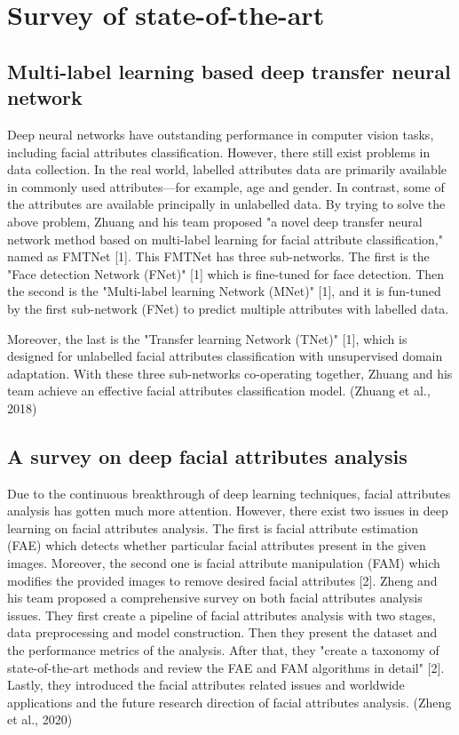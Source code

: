 \documentclass{article}
\begin{document}
\section{Survey of state-of-the-art}
\label{survey}
\subsection{Multi-label learning based deep transfer neural network}
Deep neural networks have outstanding performance in computer vision tasks, including facial attributes classification. However, there still exist problems in data collection. In the real world, labelled attributes data are primarily available in commonly used attributes—for example, age and gender. In contrast, some of the attributes are available principally in unlabelled data. By trying to solve the above problem, Zhuang and his team proposed "a novel deep transfer neural network method based on multi-label learning for facial attribute classification," named as  FMTNet [1]. This FMTNet has three sub-networks. The first is the "Face detection Network (FNet)" [1] which is fine-tuned for face detection. Then the second is the "Multi-label learning Network (MNet)" [1], and it is fun-tuned by the first sub-network (FNet) to predict multiple attributes with labelled data.

Moreover, the last is the "Transfer learning Network (TNet)" [1], which is designed for unlabelled facial attributes classification with unsupervised domain adaptation. With these three sub-networks co-operating together, Zhuang and his team achieve an effective facial attributes classification model. (Zhuang et al., 2018)

\subsection{A survey on deep facial attributes analysis}
Due to the continuous breakthrough of deep learning techniques, facial attributes analysis has gotten much more attention. However, there exist two issues in deep learning on facial attributes analysis. The first is facial attribute estimation (FAE) which detects whether particular facial attributes present in the given images. Moreover, the second one is facial attribute manipulation (FAM) which modifies the provided images to remove desired facial attributes [2]. Zheng and his team proposed a comprehensive survey on both facial attributes analysis issues. They first create a pipeline of facial attributes analysis with two stages, data preprocessing and model construction. Then they present the dataset and the performance metrics of the analysis. After that, they "create a taxonomy of state-of-the-art methods and review the FAE and FAM algorithms in detail" [2]. Lastly, they introduced the facial attributes related issues and worldwide applications and the future research direction of facial attributes analysis. (Zheng et al., 2020)
\end{document}
